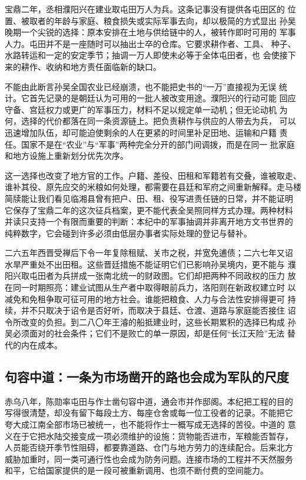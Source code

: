 宝鼎二年，丞相濮阳兴在建业取屯田万人为兵。这条记事没有提供各屯田区的
位置、被取者的年龄与家庭、粮食损失或实际军事去向，却以极简的方式显出
孙吴晚期一个尖锐的选择：原本安排在土地与供给链中的人，被转作即时可用的
军事人力。屯田并不是一座随时可以抽出士卒的仓库。它要求耕作者、工具、
种子、水路转运和一定的安定季节；抽调一万人即使未必等于全体屯田者，也
会使接下来的耕作、收纳和地方责任面临新的缺口。

不能由此断言孙吴全国农业已经崩溃，也不能把史书的“一万”直接视为无误
统计。它首先记录的是朝廷认为可用的一批人被改变用途。濮阳兴的行动可能
回应守备、宫廷权力或更广的军事压力，材料不足以规定单一动机；但无论动机
为何，选择的代价都落在同一条资源链上。把负责耕作与供应的人带去为兵，
可以迅速增加队伍，却可能迫使剩余的人在更紧的时间里补足田地、运输和户籍
责任。国家不是在“农业”与“军事”两种完全分开的部门间调拨，而是在同一
批家庭和地方设施上重新划分优先次序。

这一选择也改变了地方官的工作。户籍、差役、田租和军籍若有交叠，谁被取走、
谁补其役、原先应交的米粮如何处理，都需要在县廷和军府之间重新解释。走马楼
简牍能让我们看见临湘县曾有把户、田、租、役写进责任链的日常，并不能证明
它保存了宝鼎二年的这次征兵档案，更不能代表全吴照同样方式办理。两种材料
并读只支持一个有限而重要的判断：本纪中的军事抽调并非离开地方文书世界的
纯粹数字，它会碰到许多必须由低层办事者实际处理的登记与替补。

二六五年西晋受禅后下令一年复除租赋、关市之税，并宽免逋债；二六七年又诏
水旱严重处不出田租。这些晋廷措施不能证明它们已影响孙吴境内，更不能与
濮阳兴取屯田者为兵拼成一张南北统一的财政图。它们却把两种不同政权的压力
放在同一时期照亮：建业试图从生产者中取得眼前兵力，洛阳则在新政权建立时
以减免和免租争取可征可用的地方社会。谁能把粮食、人力与合法性安排得更可
持续，并不只取决于诏令是否好听，而取决于县廷、仓渡、道路与家庭能否接住
诏令所改变的负担。到二八〇年王濬的船抵建业时，这些长期累积的选择已构成
孙吴必须面对的社会条件；它们不是败亡的单一原因，却是任何“长江天险”无法
替代的内在成本。

\subsection{句容中道：一条为市场凿开的路也会成为军队的尺度}

赤乌八年，陈勋率屯田与作士凿句容中道，通会市并作邸阁。本纪把工程的目的
写得很清楚，却没有留下每段土方、每座仓舍或每一位工役者的记录。不能把它
夸大成江南全部市场已被统一，也不能将作士一概写成无选择的苦役。中道的
意义在于它把水陆交接变成一项必须维护的设施：货物能否进市，军粮能否暂存，
人员能否绕开季节性阻碍，都要靠道路、仓门与地方劳力的连续配合。后来北方
威胁加重时，同一类可通行性也会成为防务问题。连接市场的工程并不天然服务
和平，它给国家提供的是一段可被重新调用、也须不断付费的空间能力。

